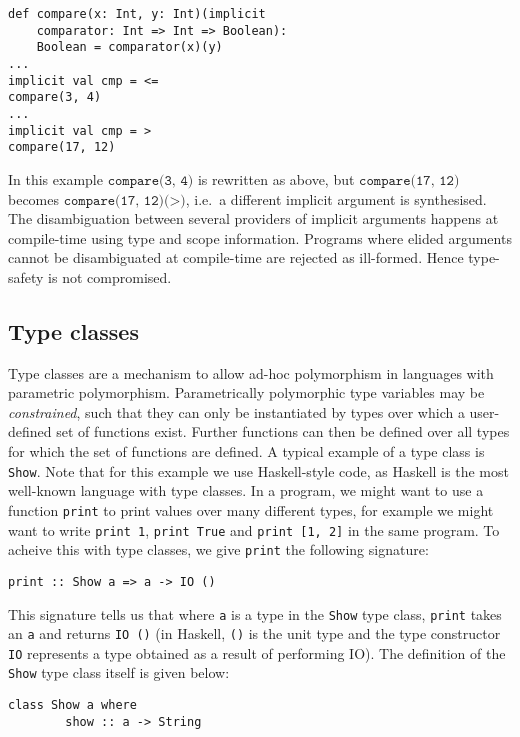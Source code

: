 \begin{minipage}{\linewidth}
\begin{lstlisting}[mathescape]
def compare(x: Int, y: Int)(implicit
    comparator: Int => Int => Boolean):
    Boolean = comparator(x)(y)
...
implicit val cmp = <=
compare(3, 4)
...
implicit val cmp = >
compare(17, 12)
\end{lstlisting}
\end{minipage}

\noindent In this example $\texttt{compare(3, 4)}$ is rewritten as above, but
$\texttt{compare(17, 12)}$ becomes $\texttt{compare(17, 12)(>)}$, i.e.~a
different implicit argument is synthesised. The disambiguation between several
providers of implicit arguments happens at compile-time using type and scope
information. Programs where elided arguments cannot be disambiguated at
compile-time are rejected as ill-formed. Hence type-safety is not compromised.

\subsection{Type classes}
Type classes \cite{K88, WB89} are a mechanism to allow ad-hoc polymorphism in
languages with parametric polymorphism. Parametrically polymorphic type
variables may be \emph{constrained}, such that they can only be instantiated by
types over which a user-defined set of functions exist. Further functions can
then be defined over all types for which the set of functions are defined. A
typical example of a type class is \texttt{Show}. Note that for this example we
use Haskell-style code, as Haskell is the most well-known language with type
classes. In a program, we might want to use a function \texttt{print} to print
values over many different types, for example we might want to write
\texttt{print 1}, \texttt{print True} and \texttt{print [1, 2]} in the same
program. To acheive this with type classes, we give \texttt{print} the following
signature:
\begin{lstlisting}[mathescape]
    print :: Show a => a -> IO ()
\end{lstlisting}

\noindent This signature tells us that where \texttt{a} is a type in the
\texttt{Show} type class, \texttt{print} takes an \texttt{a} and returns
\texttt{IO ()} (in Haskell, \texttt{()} is the unit type and the type
constructor \texttt{IO} represents a type obtained as a result of performing
IO). The definition of the \texttt{Show} type class itself is given below:
\begin{lstlisting}[mathescape]
    class Show a where
        show :: a -> String
\end{lstlisting}

